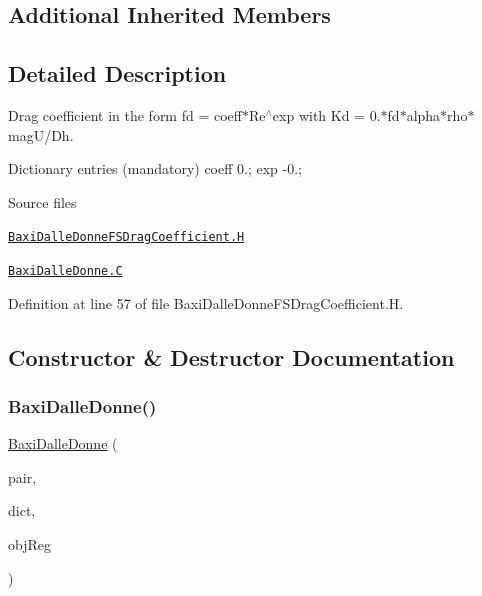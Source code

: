 \subsection*{Additional Inherited Members}


\subsection{Detailed Description}
Drag coefficient in the form fd = coeff$\ast$\+Re$^\wedge$exp with Kd = 0.$\ast$fd$\ast$alpha$\ast$rho$\ast$mag\+U/\+Dh. 

\label{_Description}%
 Dictionary entries (mandatory) coeff 0.; exp -\/0.;

\begin{DoxyParagraph}{Source files}

\begin{DoxyItemize}
\item \href{../../../home/carlo/data/GeN-Foam/GeN-Foam_ffn/GeN-Foam/GeN-Foam/classes/thermalHydraulics/src/physicsModels/dragModels/FSDragCoefficientModels/BaxiDalleDonne/BaxiDalleDonneFSDragCoefficient.H}{\tt Baxi\+Dalle\+Donne\+F\+S\+Drag\+Coefficient.\+H} 
\item \href{../../../home/carlo/data/GeN-Foam/GeN-Foam_ffn/GeN-Foam/GeN-Foam/classes/thermalHydraulics/src/physicsModels/dragModels/FSDragCoefficientModels/BaxiDalleDonne/BaxiDalleDonne.C}{\tt Baxi\+Dalle\+Donne.\+C} 
\end{DoxyItemize}
\end{DoxyParagraph}


Definition at line 57 of file Baxi\+Dalle\+Donne\+F\+S\+Drag\+Coefficient.\+H.



\subsection{Constructor \& Destructor Documentation}
\mbox{\label{classFoam_1_1FSDragCoefficientModels_1_1BaxiDalleDonne_ad0b44fc253400cf102224b88738e130d}} 
\subsubsection{\texorpdfstring{Baxi\+Dalle\+Donne()}{BaxiDalleDonne()}}
{\footnotesize\ttfamily \hyperlink{classFoam_1_1FSDragCoefficientModels_1_1BaxiDalleDonne}{Baxi\+Dalle\+Donne} (\begin{DoxyParamCaption}\item[{const \hyperlink{classFoam_1_1FSPair}{F\+S\+Pair} \&}]{pair,  }\item[{const dictionary \&}]{dict,  }\item[{const object\+Registry \&}]{obj\+Reg }\end{DoxyParamCaption})}



